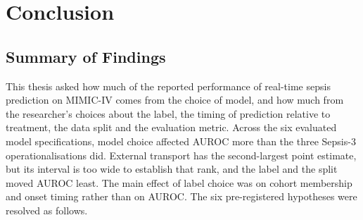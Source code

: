\chapter{Conclusion}
\label{ch:conclusion}


\section{Summary of Findings}

This thesis asked how much of the reported performance of real-time sepsis
prediction on MIMIC-IV comes from the choice of model, and how much from the
researcher's choices about the label, the timing of prediction relative to
treatment, the data split and the evaluation metric. Across the six evaluated
model specifications, model choice affected AUROC more than the three Sepsis-3
operationalisations did. External transport has the second-largest point
estimate, but its interval is too wide to establish that rank, and the label
and the split moved AUROC least. The main effect of label choice was on cohort
membership and onset timing rather than on AUROC. The six pre-registered
hypotheses were resolved as follows.

